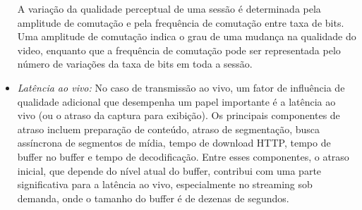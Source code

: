 \begin{itemize}
A variação da qualidade perceptual de uma sessão é determinada pela amplitude de comutação e pela frequência de comutação entre taxa de bits. 
Uma amplitude de comutação indica o grau de uma mudança na qualidade do video, enquanto que a frequência de comutação pode ser representada pelo número de variações da taxa de bits em toda a sessão.
\vspace{-0.05cm}
\item \textit{Latência ao vivo:} No caso de transmissão ao vivo, um fator de influência de qualidade adicional que desempenha um papel importante é a latência ao vivo (ou o atraso da captura para exibição). Os principais componentes de atraso incluem preparação de conteúdo, atraso de segmentação, busca assíncrona de segmentos de mídia, tempo de download HTTP, tempo de buffer no buffer e tempo de decodificação. Entre esses componentes, o atraso inicial, que depende do nível atual do buffer, contribui com uma parte significativa para a latência ao vivo, especialmente no streaming sob demanda, onde o tamanho do buffer é de dezenas de segundos.

\end{itemize}

